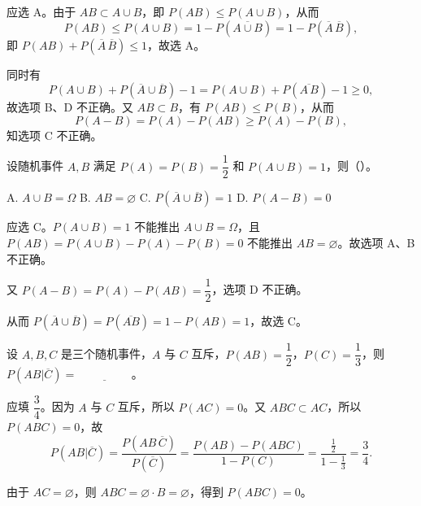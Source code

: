 \documentclass[lang=cn,11pt]{elegantbook}
\begin{document}
\begin{solution}
应选 A。由于 \(AB \subset A \cup B\)，即 \(P(AB) \le P(A \cup B)\)，从而
\[
P(AB) \le P(A \cup B) = 1 - P(\overline{A \cup B}) = 1 - P(\overline{A}\,\overline{B}),
\]
即 \(P(AB) + P(\overline{A}\,\overline{B}) \le 1\)，故选 A。

同时有
\[
P(A \cup B) + P(\overline{A} \cup \overline{B}) - 1 = P(A \cup B) + P(\overline{A\,B}) - 1 \ge 0,
\]
故选项 B、D 不正确。又 \(AB \subset B\)，有 \(P(AB) \le P(B)\)，从而
\[
P(A-B) = P(A) - P(AB) \ge P(A) - P(B),
\]
知选项 C 不正确。
\end{solution}

\begin{exercise}\label{exer:1-10}
设随机事件 \(A, B\) 满足 \(P(A)=P(B)=\dfrac{1}{2}\) 和 \(P(A \cup B)=1\)，则（）。\par
A. \(A \cup B = \Omega\)\quad
B. \(AB = \varnothing\)\quad
C. \(P(\overline{A} \cup \overline{B})=1\)\quad
D. \(P(A-B)=0\)
\end{exercise}

\begin{solution}
应选 C。\(P(A \cup B)=1\) 不能推出 \(A \cup B=\Omega\)，且 \(P(AB) = P(A \cup B) - P(A) - P(B) = 0\) 不能推出 \(AB=\varnothing\)。故选项 A、B 不正确。

又 \(P(A-B) = P(A) - P(AB) = \dfrac{1}{2}\)，选项 D 不正确。

从而 \(P(\overline{A} \cup \overline{B}) = P(\overline{AB}) = 1 - P(AB) = 1\)，故选 C。
\end{solution}

\begin{exercise}\label{exer:1-11}
设 \(A, B, C\) 是三个随机事件，\(A\) 与 \(C\) 互斥，\(P(AB)=\dfrac{1}{2}\)，\(P(C)=\dfrac{1}{3}\)，则 \(P(AB|\overline{C})=\underline{\hspace{2cm}}\)。
\end{exercise}

\begin{solution}
应填 \(\dfrac{3}{4}\)。因为 \(A\) 与 \(C\) 互斥，所以 \(P(AC)=0\)。又 \(ABC \subset AC\)，所以 \(P(ABC)=0\)，故
\[
P(AB|\overline{C}) = \frac{P(AB\,\overline{C})}{P(\overline{C})} = \frac{P(AB) - P(ABC)}{1 - P(C)} = \frac{\frac{1}{2}}{1-\frac{1}{3}} = \frac{3}{4}.
\]
\end{solution}

\begin{note}
由于 \(AC = \varnothing\)，则 \(ABC = \varnothing \cdot B = \varnothing\)，得到 \(P(ABC)=0\)。
\end{note}
\end{document}
